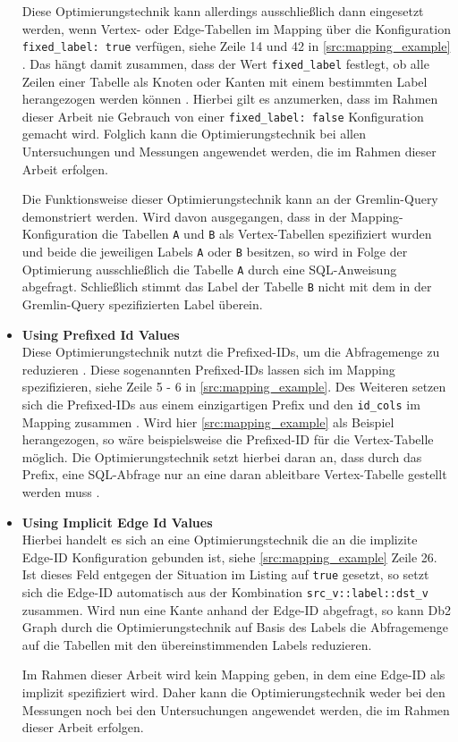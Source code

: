 \begin{itemize}
    Diese Optimierungstechnik kann allerdings ausschließlich dann eingesetzt werden, wenn Vertex- oder Edge-Tabellen im Mapping über die Konfiguration \texttt{fixed\_label: true} verfügen, siehe Zeile 14 und 42 in \autoref{src:mapping_example} \cite{sigmod_tian}. Das hängt damit zusammen, dass der Wert \texttt{fixed\_label} festlegt, ob alle Zeilen einer Tabelle als Knoten oder Kanten mit einem bestimmten Label herangezogen werden können \cite{sigmod_tian}. Hierbei gilt es anzumerken, dass im Rahmen dieser Arbeit nie Gebrauch von einer \texttt{fixed\_label: false} Konfiguration gemacht wird. Folglich kann die Optimierungstechnik bei allen Untersuchungen und Messungen angewendet werden, die im Rahmen dieser Arbeit erfolgen. 

    Die Funktionsweise dieser Optimierungstechnik kann an der Gremlin-Query  demonstriert werden. Wird davon ausgegangen, dass in der Mapping-Konfiguration die Tabellen \texttt{A} und \texttt{B} als Vertex-Tabellen spezifiziert wurden und beide die jeweiligen Labels \texttt{A} oder \texttt{B} besitzen, so wird in Folge der Optimierung ausschließlich die Tabelle \texttt{A} durch eine SQL-Anweisung abgefragt. Schließlich stimmt das Label der Tabelle \texttt{B} nicht mit dem in der Gremlin-Query spezifizierten Label überein.

    \item \textbf{Using Prefixed Id Values}\\
    Diese Optimierungstechnik nutzt die Prefixed-IDs, um die Abfragemenge zu reduzieren \cite{sigmod_tian}. Diese sogenannten Prefixed-IDs lassen sich im Mapping spezifizieren, siehe Zeile 5 - 6 in \autoref{src:mapping_example}. Des Weiteren setzen sich die Prefixed-IDs aus einem einzigartigen Prefix und den \texttt{id\_cols} im Mapping zusammen \cite{sigmod_tian}. Wird hier \autoref{src:mapping_example} als Beispiel herangezogen, so wäre beispielsweise die Prefixed-ID  für die Vertex-Tabelle möglich. Die Optimierungstechnik setzt hierbei daran an, dass durch das Prefix, eine SQL-Abfrage nur an eine daran ableitbare Vertex-Tabelle gestellt werden muss \cite{sigmod_tian}.

    \item \textbf{Using Implicit Edge Id Values}\\
    Hierbei handelt es sich an eine Optimierungstechnik die an die implizite Edge-ID Konfiguration gebunden ist, siehe \autoref{src:mapping_example} Zeile 26. Ist dieses Feld entgegen der Situation im Listing auf \texttt{true} gesetzt, so setzt sich die Edge-ID automatisch aus der Kombination \texttt{src\_v::label::dst\_v} zusammen. Wird nun eine Kante anhand der Edge-ID abgefragt, so kann Db2 Graph durch die Optimierungstechnik auf Basis des Labels die Abfragemenge auf die Tabellen mit den übereinstimmenden Labels reduzieren. 

    Im Rahmen dieser Arbeit wird kein Mapping geben, in dem eine Edge-ID als implizit spezifiziert wird. Daher kann die Optimierungstechnik weder bei den Messungen noch bei den Untersuchungen angewendet werden, die im Rahmen dieser Arbeit erfolgen. 
\end{itemize}

